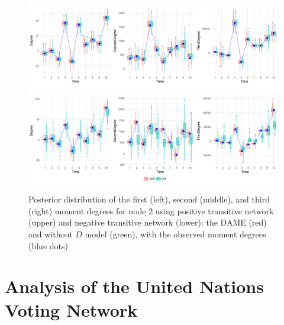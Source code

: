 \documentclass[a4paper]{article}
\begin{document}
\begin{figure}[H]
	\centering
			\includegraphics[width=1\textwidth]{plots/Degreeplot.pdf}	
						\includegraphics[width=1\textwidth]{plots/Degreeplot2.pdf}	
	\caption {Posterior distribution of the first (left), second (middle), and third (right) moment degrees for node 2 using positive transitive network (upper) and negative transitive network (lower): the DAME (red) and without $D$ model (green), with the observed moment degrees (blue dots)}
	\label{figure:negativitystudy}
\end{figure}
\section{Analysis of the United Nations Voting Network}\label{sec: UNvoting}
\end{document}
